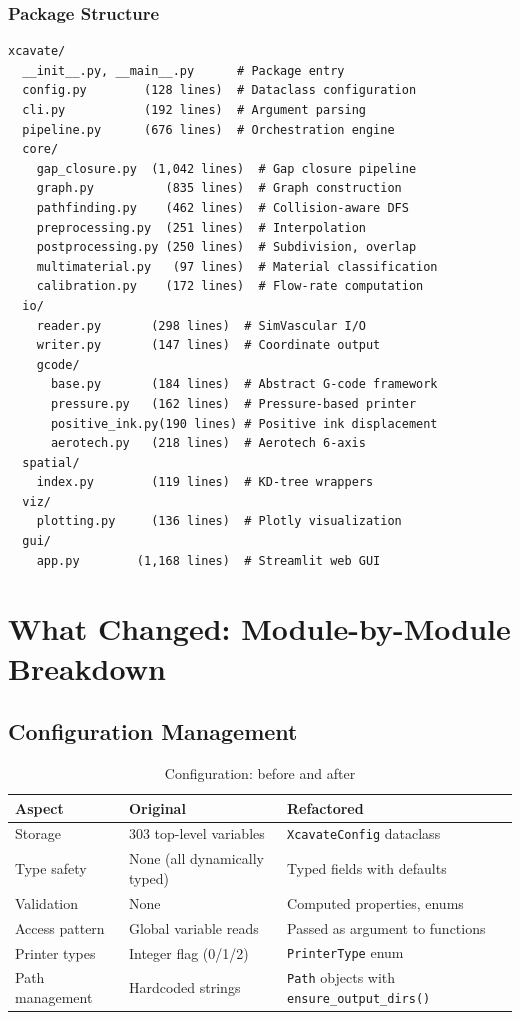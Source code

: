 \documentclass[11pt,a4paper]{article}
\begin{document}
\subsubsection{Package Structure}

\begin{lstlisting}[language={},numbers=none,basicstyle=\ttfamily\small]
xcavate/
  __init__.py, __main__.py      # Package entry
  config.py        (128 lines)  # Dataclass configuration
  cli.py           (192 lines)  # Argument parsing
  pipeline.py      (676 lines)  # Orchestration engine
  core/
    gap_closure.py  (1,042 lines)  # Gap closure pipeline
    graph.py          (835 lines)  # Graph construction
    pathfinding.py    (462 lines)  # Collision-aware DFS
    preprocessing.py  (251 lines)  # Interpolation
    postprocessing.py (250 lines)  # Subdivision, overlap
    multimaterial.py   (97 lines)  # Material classification
    calibration.py    (172 lines)  # Flow-rate computation
  io/
    reader.py       (298 lines)  # SimVascular I/O
    writer.py       (147 lines)  # Coordinate output
    gcode/
      base.py       (184 lines)  # Abstract G-code framework
      pressure.py   (162 lines)  # Pressure-based printer
      positive_ink.py(190 lines) # Positive ink displacement
      aerotech.py   (218 lines)  # Aerotech 6-axis
  spatial/
    index.py        (119 lines)  # KD-tree wrappers
  viz/
    plotting.py     (136 lines)  # Plotly visualization
  gui/
    app.py        (1,168 lines)  # Streamlit web GUI
\end{lstlisting}


\section{What Changed: Module-by-Module Breakdown}

\subsection{Configuration Management}

\begin{table}[H]
\centering
\caption{Configuration: before and after}
\begin{tabularx}{\textwidth}{lXX}
\toprule
\textbf{Aspect} & \textbf{Original} & \textbf{Refactored} \\
\midrule
Storage & 303 top-level variables & \texttt{XcavateConfig} dataclass \\
Type safety & None (all dynamically typed) & Typed fields with defaults \\
Validation & None & Computed properties, enums \\
Access pattern & Global variable reads & Passed as argument to functions \\
Printer types & Integer flag (0/1/2) & \texttt{PrinterType} enum \\
Path management & Hardcoded strings & \texttt{Path} objects with \texttt{ensure\_output\_dirs()} \\
\bottomrule
\end{tabularx}
\end{table}
\end{document}
